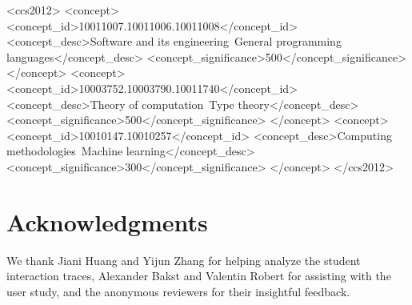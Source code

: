 \documentclass[acmsmall,screen]{acmart}\settopmatter{}
\begin{document}


\begin{CCSXML}
<ccs2012>
<concept>
<concept_id>10011007.10011006.10011008</concept_id>
<concept_desc>Software and its engineering~General programming languages</concept_desc>
<concept_significance>500</concept_significance>
</concept>
<concept>
<concept_id>10003752.10003790.10011740</concept_id>
<concept_desc>Theory of computation~Type theory</concept_desc>
<concept_significance>500</concept_significance>
</concept>
<concept>
<concept_id>10010147.10010257</concept_id>
<concept_desc>Computing methodologies~Machine learning</concept_desc>
<concept_significance>300</concept_significance>
</concept>
</ccs2012>
\end{CCSXML}





\maketitle



% 








\section*{Acknowledgments}
We thank Jiani Huang and Yijun Zhang for helping analyze the student
interaction traces, Alexander Bakst and Valentin Robert for assisting
with the user study, and the anonymous reviewers for their insightful
feedback.
\end{document}
